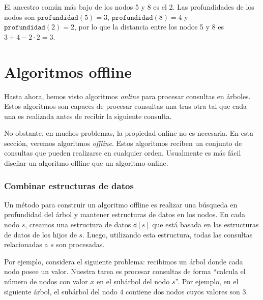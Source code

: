 El ancestro común más bajo de los nodos 5 y 8 es el 2. Las profundidades
de los nodos son $\texttt{profundidad}(5)=3$, $\texttt{profundidad}(8)=4$
y $\texttt{profundidad}(2)=2$, por lo que la distancia entre los nodos
5 y 8 es $3+4-2\cdot2=3$.

\section{Algoritmos offline}


Hasta ahora, hemos visto algoritmos \emph{online} para procesar
consultas en árboles. Estos algoritmos son capaces de procesar
consultas una tras otra tal que cada una es realizada antes
de recibir la siguiente consulta.

No obstante, en muchos problemas, la propiedad online no es necesaria.
En esta sección, veremos algoritmos \emph{offline}. Estos algoritmos
reciben un conjunto de consultas que pueden realizarse en cualquier
orden. Usualmente es más fácil diseñar un algoritmo offline que un
algoritmo online.

\subsubsection{Combinar estructuras de datos}

Un método para construir un algoritmo offline es realizar una
búsqueda en profundidad del árbol y mantener estructuras de datos
en los nodos. En cada nodo $s$, creamos una estructura de datos
$\texttt{d}[s]$ que está basada en las estructuras de datos de los
hijos de $s$. Luego, utilizando esta estructura, todas las consultas
relacionadas a $s$ son procesadas.

Por ejemplo, considera el siguiente problema: recibimos un árbol
donde cada nodo posee un valor. Nuestra tarea es procesar consultas
de forma ``calcula el número de nodos con valor $x$ en el subárbol
del nodo $s$''. Por ejemplo, en el siguiente árbol, el subárbol del
nodo $4$ contiene dos nodos cuyos valores son 3.


